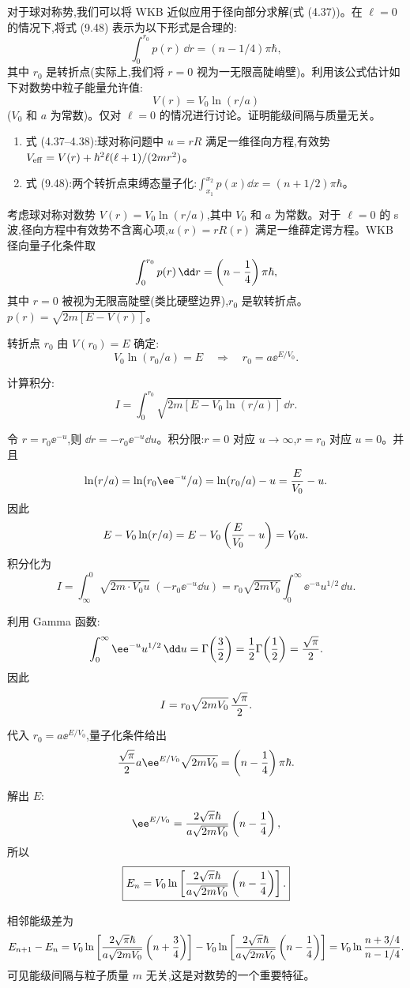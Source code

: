 \begin{question}
对于球对称势,我们可以将 WKB 近似应用于径向部分求解(式 (4.37))。在 $\ell=0$ 的情况下,将式 (9.48) 表示为以下形式是合理的:
\[
\int_0^{r_0}p(r)\,\dd r=(n-1/4)\pi\hbar,
\]
其中 $r_0$ 是转折点(实际上,我们将 $r=0$ 视为一无限高陡峭壁)。利用该公式估计如下对数势中粒子能量允许值:
\[
V(r)=V_0\ln(r/a)
\]
($V_0$ 和 $a$ 为常数)。仅对 $\ell=0$ 的情况进行讨论。证明能级间隔与质量无关。

\par\smallskip
{}
\begin{enumerate}[leftmargin=2.2em,itemsep=0.12em,topsep=0.12em,parsep=0pt]
\item 式 (4.37--4.38):球对称问题中 $u=rR$ 满足一维径向方程,有效势 $V_{\rm eff}=V(r)+\hbar^2\ell(\ell+1)/(2mr^2)$。
\item 式 (9.48):两个转折点束缚态量子化:$\int_{x_1}^{x_2}p(x)\dd x=(n+1/2)\pi\hbar$。
\end{enumerate}

\begin{solution}
考虑球对称对数势 $V(r)=V_0\ln(r/a)$,其中 $V_0$ 和 $a$ 为常数。对于 $\ell=0$ 的 s 波,径向方程中有效势不含离心项,$u(r)=rR(r)$ 满足一维薛定谔方程。WKB 径向量子化条件取
\[
\int_0^{r_0}p(r)\,\dd r=\left(n-{1\over4}\right)\pi\hbar,
\]
其中 $r=0$ 被视为无限高陡壁(类比硬壁边界),$r_0$ 是软转折点。$p(r)=\sqrt{2m[E-V(r)]}$。

转折点 $r_0$ 由 $V(r_0)=E$ 确定:
\[
V_0\ln(r_0/a)=E\quad\Longrightarrow\quad r_0=a \ee^{E/V_0}.
\]

计算积分:
\[
I=\int_0^{r_0}\sqrt{2m\left[E-V_0\ln(r/a)\right]}\,\dd r.
\]

令 $r=r_0\ee^{-u}$,则 $\dd r=-r_0\ee^{-u}\dd u$。积分限:$r=0$ 对应 $u\to\infty$,$r=r_0$ 对应 $u=0$。并且
\[
\ln(r/a)=\ln(r_0\ee^{-u}/a)=\ln(r_0/a)-u={E\over V_0}-u.
\]
因此
\[
E-V_0\ln(r/a)=E-V_0\left({E\over V_0}-u\right)=V_0u.
\]
积分化为
\[
I=\int_\infty^0\sqrt{2m\cdot V_0u}\;(-r_0\ee^{-u}\dd u)
=r_0\sqrt{2mV_0}\int_0^\infty \ee^{-u}u^{1/2}\,\dd u.
\]

利用 Gamma 函数:
\[
\int_0^\infty \ee^{-u}u^{1/2}\,\dd u=\Gamma\!\left({3\over2}\right)
={1\over2}\Gamma\!\left({1\over2}\right)={\sqrt\pi\over2}.
\]
因此
\[
I=r_0\sqrt{2mV_0}\,{\sqrt\pi\over2}.
\]

代入 $r_0=a \ee^{E/V_0}$,量子化条件给出
\[
{\sqrt\pi\over2}a \ee^{E/V_0}\sqrt{2mV_0}=\left(n-{1\over4}\right)\pi\hbar.
\]

解出 $E$:
\[
\ee^{E/V_0}={2\sqrt\pi\hbar\over a\sqrt{2mV_0}}\left(n-{1\over4}\right),
\]
所以
\[
\boxed{E_n=V_0\ln\left[{2\sqrt\pi\hbar\over a\sqrt{2mV_0}}
\left(n-{1\over4}\right)\right].}
\]

相邻能级差为
\[
E_{n+1}-E_n
=V_0\ln\left[{2\sqrt\pi\hbar\over a\sqrt{2mV_0}}\left(n+{3\over4}\right)\right]
-V_0\ln\left[{2\sqrt\pi\hbar\over a\sqrt{2mV_0}}\left(n-{1\over4}\right)\right]
=V_0\ln{n+3/4\over n-1/4}.
\]
可见能级间隔与粒子质量 $m$ 无关,这是对数势的一个重要特征。
\end{solution}
\end{question}

